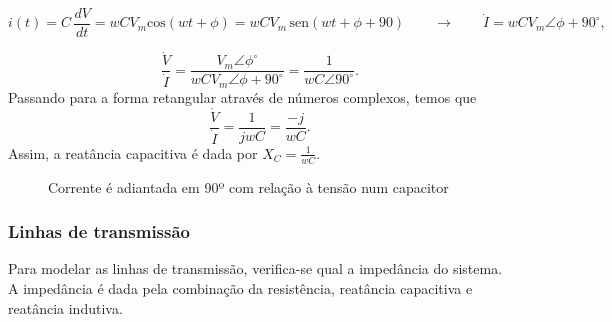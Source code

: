 \[
i(t)=C\,\frac{dV}{dt}=wCV_{m}\mbox{cos}(wt+\phi)=wCV_{m}\,\mbox{sen}(wt+\phi+90)\qquad\longrightarrow\qquad\dot{I}=wCV_{m}\angle\phi+90^{\circ},
\]


\[
\frac{\dot{V}}{\dot{I}}=\frac{V_{m}\angle\phi^{\circ}}{wCV_{m}\angle\phi+90^{\circ}}=\frac{1}{wC\angle90^{\circ}}.
\]
Passando para a forma retangular através de números complexos, temos que
\[
\frac{\dot{V}}{\dot{I}}=\frac{1}{jwC}=\frac{-j}{wC}.
\]
Assim, a reatância capacitiva é dada por $X_{C}=\frac{1}{wC}$. 

\begin{figure}[H]
\begin{center}
\caption{\label{fig:fase-ct-indutor}Corrente é adiantada em 90º com relação à tensão num capacitor}
\end{center}
\end{figure}

\subsubsection*{Linhas de transmissão}

Para modelar as linhas de transmissão, verifica-se qual a impedância do sistema. A impedância é dada pela combinação da resistência, reatância capacitiva e reatância indutiva.

